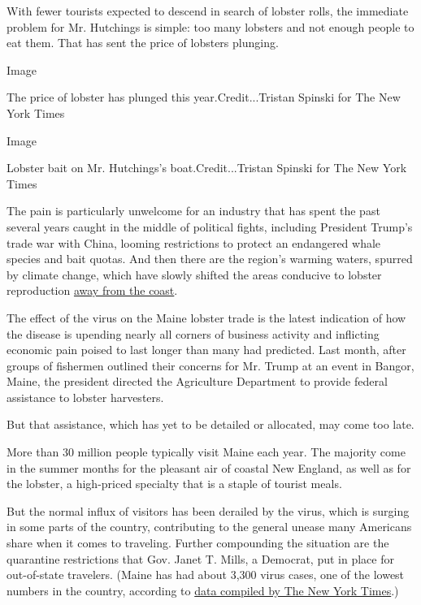 With fewer tourists expected to descend in search of lobster rolls, the
immediate problem for Mr. Hutchings is simple: too many lobsters and not
enough people to eat them. That has sent the price of lobsters plunging.

Image

The price of lobster has plunged this year.Credit...Tristan Spinski for
The New York Times

Image

Lobster bait on Mr. Hutchings's boat.Credit...Tristan Spinski for The
New York Times

The pain is particularly unwelcome for an industry that has spent the
past several years caught in the middle of political fights, including
President Trump's trade war with China, looming restrictions to protect
an endangered whale species and bait quotas. And then there are the
region's warming waters, spurred by climate change, which have slowly
shifted the areas conducive to lobster reproduction
\href{https://www.nytimes3xbfgragh.onion/2018/06/21/climate/maine-lobsters.html}{away
from the coast}.

The effect of the virus on the Maine lobster trade is the latest
indication of how the disease is upending nearly all corners of business
activity and inflicting economic pain poised to last longer than many
had predicted. Last month, after groups of fishermen outlined their
concerns for Mr. Trump at an event in Bangor, Maine, the president
directed the Agriculture Department to provide federal assistance to
lobster harvesters.

But that assistance, which has yet to be detailed or allocated, may come
too late.

More than 30 million people typically visit Maine each year. The
majority come in the summer months for the pleasant air of coastal New
England, as well as for the lobster, a high-priced specialty that is a
staple of tourist meals.

But the normal influx of visitors has been derailed by the virus, which
is surging in some parts of the country, contributing to the general
unease many Americans share when it comes to traveling. Further
compounding the situation are the quarantine restrictions that Gov.
Janet T. Mills, a Democrat, put in place for out-of-state travelers.
(Maine has had about 3,300 virus cases, one of the lowest numbers in the
country, according to
\href{https://www.nytimes3xbfgragh.onion/interactive/2020/us/maine-coronavirus-cases.html}{data
compiled by The New York Times}.)

